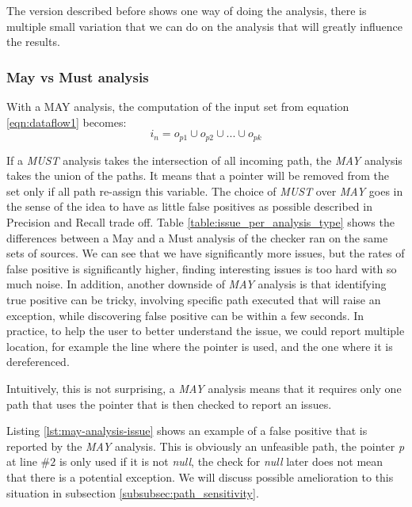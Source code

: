 The version described before shows one way of doing the analysis, there is multiple small variation that we can do on the analysis that will greatly influence the results.

\subsubsection{May vs Must analysis}
\label{subsubsec:may_vs_must}

With a MAY analysis, the computation of the input set from equation \ref{eqn:dataflow1} becomes:
\begin{equation}\label{eqn:mayvsmust}
i_{n} = o_{p1}  \cup   o_{p2}  \cup  ... \cup   o_{pk}
\end{equation}

If a \emph{MUST} analysis takes the intersection of all incoming path, the \emph{MAY} analysis takes the union of the paths. It means that a pointer will be removed from the set only if all path re-assign this variable.
The choice of \emph{MUST} over \emph{MAY} goes in the sense of the idea to have as little false positives as possible described in Precision and Recall trade off.
Table \ref{table:issue_per_analysis_type} shows the differences between a May and a Must analysis of the checker ran on the same sets of sources.
We can see that we have significantly more issues, but the rates of false positive is significantly higher, finding interesting issues is too hard with so much noise. 
In addition, another downside of \emph{MAY} analysis is that identifying true positive can be tricky, involving specific path executed that will raise an exception, while discovering false positive can be within a few seconds. 
In practice, to help the user to better understand the issue, we could report multiple location, for example the line where the pointer is used, and the one where it is dereferenced. 

Intuitively, this is not surprising, a \emph{MAY} analysis means that it requires only one path that uses the pointer that is then checked to report an issues. 



Listing \ref{lst:may-analysis-issue} shows an example of a false positive that is reported by the \emph{MAY} analysis. 
This is obviously an unfeasible path, the pointer \emph{p} at line $\#2$ is only used if it is not \emph{null}, the check for \emph{null} later does not mean that there is a potential exception.
We will discuss possible amelioration to this situation in subsection \ref{subsubsec:path_sensitivity}.

